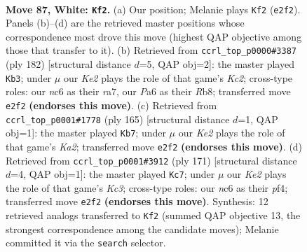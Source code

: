 \documentclass[11pt]{article}
\begin{document}
\clearpage

\begin{figure}[p]\centering
\begin{subfigure}{0.46\textwidth}\centering
\resizebox{\linewidth}{!}{%
\newchessgame
\chessboard[
  setfen={8/6R1/P1n1k3/8/8/7r/4K3/8 w - - 1 87},
  showmover=false,
  pgfstyle=straightmove, color=movearrow, markmove={e2-f2}
]}
\caption{}
\end{subfigure}\hfill
\begin{subfigure}{0.46\textwidth}\centering
\resizebox{\linewidth}{!}{%
\newchessgame
\chessboard[
  setfen={1R6/r7/3r4/8/7R/8/2K3k1/8 w - - 18 92},
  showmover=false,
  pgfstyle=straightmove, color=movearrow, markmove={c2-b3}
]}
\caption{}
\end{subfigure}
\\[4pt]
\begin{subfigure}{0.46\textwidth}\centering
\resizebox{\linewidth}{!}{%
\newchessgame
\chessboard[
  setfen={8/k7/7R/p7/4N3/8/6r1/4K3 b - - 15 83},
  showmover=false,
  pgfstyle=straightmove, color=movearrow, markmove={a7-b7}
]}
\caption{}
\end{subfigure}\hfill
\begin{subfigure}{0.46\textwidth}\centering
\resizebox{\linewidth}{!}{%
\newchessgame
\chessboard[
  setfen={3R4/6r1/2k1p3/8/5P2/8/2K5/8 b - - 0 86},
  showmover=false,
  pgfstyle=straightmove, color=movearrow, markmove={c6-c7}
]}
\caption{}
\end{subfigure}
\caption{\textbf{Move 87, White: \texttt{Kf2}.} (a) Our position; Melanie plays \texttt{Kf2} (\texttt{e2f2}). Panels (b)--(d) are the retrieved master positions whose correspondence most drove this move (highest QAP objective among those that transfer to it). (b) Retrieved from \texttt{ccrl\_top\_p0000\#3387} (ply 182) [structural distance $d$=5, QAP obj=2]: the master played \texttt{Kb3}; under $\mu$ our \emph{Ke2} plays the role of that game's \emph{Kc2}; cross-type roles: our \emph{n}c6 as their \emph{r}a7, our \emph{P}a6 as their \emph{R}b8; transferred move \texttt{e2f2} \textbf{(endorses this move)}. (c) Retrieved from \texttt{ccrl\_top\_p0001\#1778} (ply 165) [structural distance $d$=1, QAP obj=1]: the master played \texttt{Kb7}; under $\mu$ our \emph{Ke2} plays the role of that game's \emph{Ka2}; transferred move \texttt{e2f2} \textbf{(endorses this move)}. (d) Retrieved from \texttt{ccrl\_top\_p0001\#3912} (ply 171) [structural distance $d$=4, QAP obj=1]: the master played \texttt{Kc7}; under $\mu$ our \emph{Ke2} plays the role of that game's \emph{Kc3}; cross-type roles: our \emph{n}c6 as their \emph{p}f4; transferred move \texttt{e2f2} \textbf{(endorses this move)}. Synthesis: 12 retrieved analogs transferred to \texttt{Kf2} (summed QAP objective 13, the strongest correspondence among the candidate moves); Melanie committed it via the \texttt{search} selector.}
\label{fig:thought-m172}
\end{figure}
\end{document}
